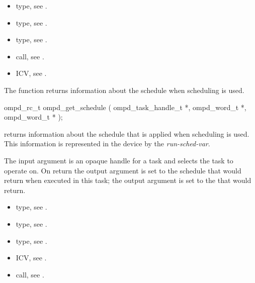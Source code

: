 \crossreferences
\begin{itemize}
  \item {} type, see .
	\item {} type, see .
	\item {} type, see .
	\item {} call, see .
	\item {} ICV, see .
\end{itemize}

\label{subsubsubsec:ompd_get_schedule}
\summary
The  function returns information about the schedule when  scheduling is used.

\format
\begin{cspecific}
\begin{ompSyntax}
ompd_rc_t ompd_get_schedule (
  ompd_task_handle_t *,
  ompd_word_t *,
  ompd_word_t *
);
\end{ompSyntax}
\end{cspecific}

\descr

 returns information about the schedule that is
applied when  scheduling is used.
%
This information is represented in the device by the
\emph{run-sched-var}.

\argdesc
The input argument  is an opaque handle for a task and selects the task to operate on.
On return the output argument  is set to the schedule that  would return when
executed in this task; the output argument  is set to the  that
 would return.


\crossreferences
\begin{itemize}
  \item {} type, see .
	\item {} type, see .
	\item {} type, see .
	\item {} ICV, see .
	\item {} call, see .
\end{itemize}


